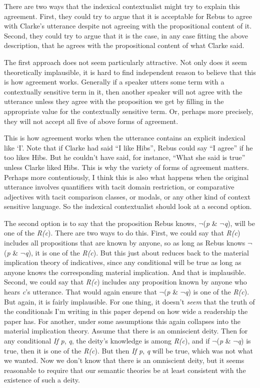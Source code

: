 \documentclass[
  11pt,
  letterpaper,
  DIV=11,
  numbers=noendperiod,
  oneside]{scrartcl}
\begin{document}
There are two ways that the indexical contextualist might try to explain
this agreement. First, they could try to argue that it is acceptable for
Rebus to agree with Clarke's utterance despite not agreeing with the
propositional content of it. Second, they could try to argue that it is
the case, in any case fitting the above description, that he agrees with
the propositional content of what Clarke said.

The first approach does not seem particularly attractive. Not only does
it seem theoretically implausible, it is hard to find independent reason
to believe that this is how agreement works. Generally if a speaker
utters some term with a contextually sensitive term in it, then another
speaker will not agree with the utterance unless they agree with the
proposition we get by filling in the appropriate value for the
contextually sensitive term. Or, perhaps more precisely, they will not
accept all five of above forms of agreement.

This is how agreement works when the utterance contains an explicit
indexical like `I'. Note that if Clarke had said ``I like Hibs'', Rebus
could say ``I agree'' if he too likes Hibs. But he couldn't have said,
for instance, ``What she said is true'' unless Clarke liked Hibs. This
is why the variety of forms of agreement matters. Perhaps more
contentiously, I think this is also what happens when the original
utterance involves quantifiers with tacit domain restriction, or
comparative adjectives with tacit comparison classes, or modals, or any
other kind of context sensitive language. So the indexical contextualist
should look at a second option.

The second option is to say that the proposition Rebus knows,
\(\neg\)(\emph{p} \& \(\neg\)\emph{q}), will be one of the \emph{R(c}).
There are two ways to do this. First, we could say that \emph{R(c})
includes all propositions that are known by anyone, so as long as Rebus
knows \(\neg\)(\emph{p} \& \(\neg\)\emph{q}), it is one of the
\emph{R(c}). But this just about reduces back to the material
implication theory of indicatives, since any conditional will be true as
long as anyone knows the corresponding material implication. And that is
implausible. Second, we could say that \emph{R(c}) includes any
proposition known by anyone who hears \emph{c}'s utterance. That would
again ensure that \(\neg\)(\emph{p} \& \(\neg\)\emph{q}) is one of the
\emph{R(c}). But again, it is fairly implausible. For one thing, it
doesn't \emph{seem} that the truth of the conditionals I'm writing in
this paper depend on how wide a readership the paper has. For another,
under some assumptions this again collapses into the material
implication theory. Assume that there is an omniscient deity. Then for
any conditional \emph{If p}, \emph{q}, the deity's knowledge is among
\emph{R(c}), and if \(\neg\)(\emph{p} \& \(\neg\)\emph{q}) is true, then
it is one of the \emph{R(c}). But then \emph{If p}, \emph{q} will be
true, which was not what we wanted. Now we don't know that there is an
omniscient deity, but it seems reasonable to require that our semantic
theories be at least consistent with the existence of such a deity.
\end{document}
